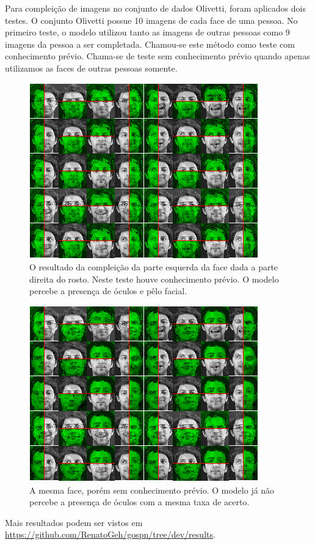 \documentclass[12pt]{article}
\theoremstyle{plain}
\numberwithin{equation}{section}
\begin{document}
Para compleição de imagens no conjunto de dados Olivetti, foram aplicados dois testes. O conjunto
Olivetti possue 10 imagens de cada face de uma pessoa. No primeiro teste, o modelo utilizou tanto
as imagens de outras pessoas como 9 imagens da pessoa a ser completada. Chamou-se este método como
teste com conhecimento prévio. Chama-se de teste sem conhecimento prévio quando apenas utilizamos
as faces de outras pessoas somente.

\begin{figure}[h]
  \centering\includegraphics[scale=1.3]{imgs/c1_face_cmpl_39.png}
  \captionsetup{justification=raggedright}
  \caption{O resultado da compleição da parte esquerda da face dada a parte direita do rosto. Neste
  teste houve conhecimento prévio. O modelo percebe a presença de óculos e pêlo facial.}
\end{figure}
\newpage

\begin{figure}[h]
  \centering\includegraphics[scale=1.3]{imgs/c2_face_cmpl_39.png}
  \captionsetup{justification=raggedright}
  \caption{A mesma face, porém sem conhecimento prévio. O modelo já não percebe a presença de
  óculos com a mesma taxa de acerto.}
\end{figure}

Mais resultados podem ser vistos em \url{https://github.com/RenatoGeh/gospn/tree/dev/results}.

\newpage
\printbibliography[]
\end{document}
